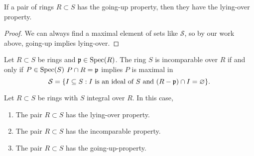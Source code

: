 \documentclass{ximera}
\begin{document}
\begin{corollary}
  If a pair of rings $R\subset S$ has the going-up property, then they
  have the lying-over property.
  \begin{proof}
    We can always find a maximal element of sets like $\mathcal{S}$,
    so by our work above, going-up implies lying-over.
  \end{proof}
\end{corollary}


\begin{proposition}
  Let $R\subset S$ be rings and $\mathfrak{p}\in\operatorname{Spec}(R)$. The ring $S$ is
  incomparable over $R$ if and only if $P\in\operatorname{Spec}(S)$ $P\cap R =\mathfrak{p}$
  implies $P$ is maximal in
  \[
  \mathcal{S} = \{I\subseteq S: \text{$I$ is an ideal of $S$ and
    $(R-\mathfrak{p})\cap I = \varnothing$}\}.
  \]
\end{proposition}


\begin{theorem}
  Let $R\subset S$ be rings with $S$ integral over $R$. In this case,
  \begin{enumerate}
  \item The pair $R\subset S$ has the lying-over property.
  \item The pair $R\subset S$ has the incomparable property.
  \item The pair $R\subset S$ has the going-up-property.
  \end{enumerate}
\end{theorem}
\end{document}

